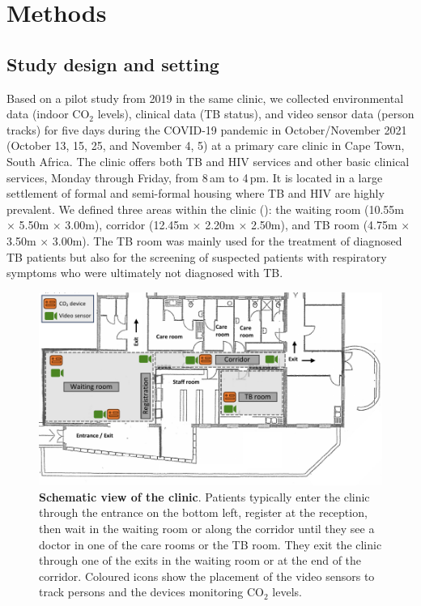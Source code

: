 \documentclass[fleqn,11pt]{wlscirep}
\begin{document}
\newpage

\section*{Methods}

\subsection*{Study design and setting}

Based on a pilot study from 2019 in the same clinic\cite{Zurcher2022JID,Zurcher2020BMJ}, we collected environmental data (indoor CO$_2$ levels), clinical data (TB status), and video sensor data (person tracks) for five days during the COVID-19 pandemic in October/November 2021 (October 13, 15, 25, and November 4, 5) at a primary care clinic in Cape Town, South Africa. The clinic offers both TB and HIV services and other basic clinical services, Monday through Friday, from 8\,am to 4\,pm. It is located in a large settlement of formal and semi-formal housing where TB and HIV are highly prevalent\cite{Wood2007AMJRCCD,Middelkoop2011JAIDS}. We defined three areas within the clinic (): the waiting room (10.55m $\times$ 5.50m $\times$ 3.00m), corridor (12.45m $\times$ 2.20m $\times$ 2.50m), and TB room (4.75m $\times$ 3.50m $\times$ 3.00m). The TB room was mainly used for the treatment of diagnosed TB patients but also for the screening of suspected patients with respiratory symptoms who were ultimately not diagnosed with TB.

\begin{figure}[!htpb]
    \centering
    \includegraphics{doc/clinic-schematic-annotated-view.pdf}
    \caption{\textbf{Schematic view of the clinic}. Patients typically enter the clinic through the entrance on the bottom left, register at the reception, then wait in the waiting room or along the corridor until they see a doctor in one of the care rooms or the TB room. They exit the clinic through one of the exits in the waiting room or at the end of the corridor. Coloured icons show the placement of the video sensors to track persons and the devices monitoring CO$_2$ levels.}
    \label{fig:floor-plan}
\end{figure}
\end{document}
